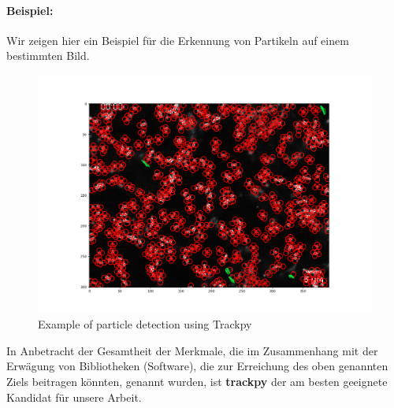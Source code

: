 	\paragraph{Beispiel:}
	Wir zeigen hier ein Beispiel für die Erkennung von Partikeln auf einem bestimmten Bild.\\
	\begin{figure}[H]
    \centering
    \includegraphics[scale=0.35]{Grafiken/trackpyBilder/locate(f0, diameter=3).png}
    \caption{Example of particle detection using Trackpy}
    \label{fig:bild_label}
\end{figure}
	
In Anbetracht der Gesamtheit der Merkmale, die im Zusammenhang mit der Erwägung von Bibliotheken (Software), die zur Erreichung des oben genannten Ziels beitragen könnten, genannt wurden, ist \textbf{trackpy} der am besten geeignete Kandidat für unsere Arbeit. 


